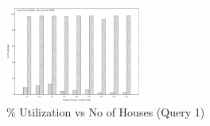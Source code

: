 \begin{figure}[h]
\begin{center}
	\includegraphics[width=0.4\textwidth]{img/q1_utilization}
	\vspace*{-0.4cm}
	\caption{\% Utilization vs No of Houses (Query 1)\label{fig:q1_util}}
\end{center}
\end{figure}
\vspace*{-0.4cm}
